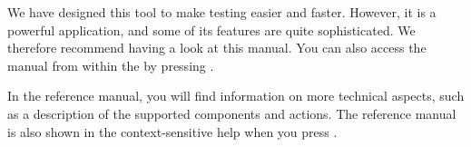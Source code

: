We have designed this tool to make testing easier and faster. However, it is a powerful application, and some of its features are quite sophisticated. We therefore recommend having a look at this manual. You can also access the manual from within the \ite{} by pressing .  

In the reference manual, you will find information on more technical aspects, such as a description of the supported components and actions. The reference manual is also shown in the context-sensitive help when you press . 



